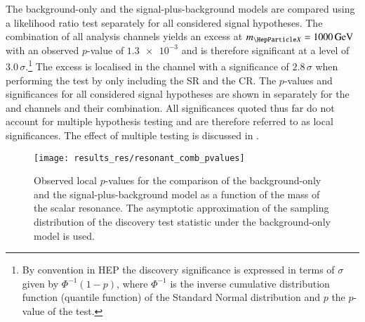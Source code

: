 %
The background-only and the signal-plus-background models are compared using a
likelihood ratio test separately for all considered signal hypotheses. The
combination of all analysis channels yields an excess at $\mX = \SI{1000}{\GeV}$
with an observed $p$-value of $\num{1.3e-3}$ and is therefore significant at a
level of $\num{3.0}\,\sigma$.\footnote{By convention in HEP the discovery
  significance is expressed in terms of $\sigma$ given by $\Phi^{-1}(1 - p)$,
  where $\Phi^{-1}$ is the inverse cumulative distribution function (quantile
  function) of the Standard Normal distribution and $p$ the $p$-value of the
  test.} The excess is localised in the \hadhad channel with a significance of
$\num{2.8}\,\sigma$ when performing the test by only including the \hadhad SR
and the \ZHF CR. The $p$-values and significances for all considered signal
hypotheses are shown in  separately for the \lephad and
\hadhad channels and their combination. All significances quoted thus far do not
account for multiple hypothesis testing and are therefore referred to as local
significances. The effect of multiple testing is discussed in
.

\begin{figure}[htbp]
  \centering

  \texttt{[image: results\_res/resonant\_comb\_pvalues]}

  \caption{Observed local $p$-values for the comparison of the background-only
    and the signal-plus-background model as a function of the mass of the scalar
    resonance. The asymptotic approximation of the sampling distribution of the
    discovery test statistic under the background-only model is used.}%
  \label{fig:local_pvalues}

\end{figure}

